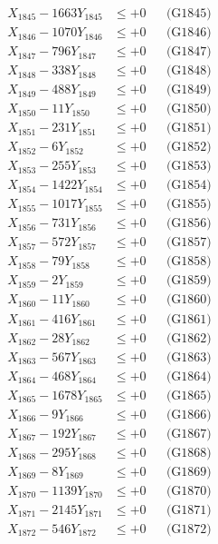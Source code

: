 \documentclass[a4paper,10pt]{article}
\begin{document}
{\begin{align}
X_{1845} - 1663Y_{1845} &\leq +0 && \text{(G1845)} \\
X_{1846} - 1070Y_{1846} &\leq +0 && \text{(G1846)} \\
X_{1847} - 796Y_{1847} &\leq +0 && \text{(G1847)} \\
X_{1848} - 338Y_{1848} &\leq +0 && \text{(G1848)} \\
X_{1849} - 488Y_{1849} &\leq +0 && \text{(G1849)} \\
X_{1850} - 11Y_{1850} &\leq +0 && \text{(G1850)} \\
\allowbreak
X_{1851} - 231Y_{1851} &\leq +0 && \text{(G1851)} \\
X_{1852} - 6Y_{1852} &\leq +0 && \text{(G1852)} \\
X_{1853} - 255Y_{1853} &\leq +0 && \text{(G1853)} \\
X_{1854} - 1422Y_{1854} &\leq +0 && \text{(G1854)} \\
X_{1855} - 1017Y_{1855} &\leq +0 && \text{(G1855)} \\
X_{1856} - 731Y_{1856} &\leq +0 && \text{(G1856)} \\
X_{1857} - 572Y_{1857} &\leq +0 && \text{(G1857)} \\
X_{1858} - 79Y_{1858} &\leq +0 && \text{(G1858)} \\
X_{1859} - 2Y_{1859} &\leq +0 && \text{(G1859)} \\
X_{1860} - 11Y_{1860} &\leq +0 && \text{(G1860)} \\
\allowbreak
X_{1861} - 416Y_{1861} &\leq +0 && \text{(G1861)} \\
X_{1862} - 28Y_{1862} &\leq +0 && \text{(G1862)} \\
X_{1863} - 567Y_{1863} &\leq +0 && \text{(G1863)} \\
X_{1864} - 468Y_{1864} &\leq +0 && \text{(G1864)} \\
X_{1865} - 1678Y_{1865} &\leq +0 && \text{(G1865)} \\
X_{1866} - 9Y_{1866} &\leq +0 && \text{(G1866)} \\
X_{1867} - 192Y_{1867} &\leq +0 && \text{(G1867)} \\
X_{1868} - 295Y_{1868} &\leq +0 && \text{(G1868)} \\
X_{1869} - 8Y_{1869} &\leq +0 && \text{(G1869)} \\
X_{1870} - 1139Y_{1870} &\leq +0 && \text{(G1870)} \\
\allowbreak
X_{1871} - 2145Y_{1871} &\leq +0 && \text{(G1871)} \\
X_{1872} - 546Y_{1872} &\leq +0 && \text{(G1872)} \\

\end{align}}
\end{document}
